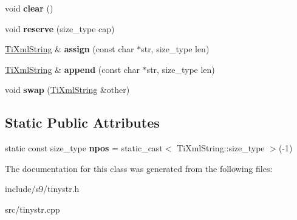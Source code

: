 \begin{DoxyCompactItemize}
\item 
\hypertarget{classTiXmlString_ab20e06e4c666abf3bdbfb3a1191d4888}{void {\bfseries clear} ()}\label{classTiXmlString_ab20e06e4c666abf3bdbfb3a1191d4888}

\item 
\hypertarget{classTiXmlString_a88ecf9f0f00cb5c67b6b637958d7049c}{void {\bfseries reserve} (size\-\_\-type cap)}\label{classTiXmlString_a88ecf9f0f00cb5c67b6b637958d7049c}

\item 
\hypertarget{classTiXmlString_ac72f3d9149b7812c1e6c59402014d0d5}{\hyperlink{classTiXmlString}{Ti\-Xml\-String} \& {\bfseries assign} (const char $\ast$str, size\-\_\-type len)}\label{classTiXmlString_ac72f3d9149b7812c1e6c59402014d0d5}

\item 
\hypertarget{classTiXmlString_ad44b21700d2ec24a511367b222b643fb}{\hyperlink{classTiXmlString}{Ti\-Xml\-String} \& {\bfseries append} (const char $\ast$str, size\-\_\-type len)}\label{classTiXmlString_ad44b21700d2ec24a511367b222b643fb}

\item 
\hypertarget{classTiXmlString_aa392cbc180752a79f007f4f9280c7762}{void {\bfseries swap} (\hyperlink{classTiXmlString}{Ti\-Xml\-String} \&other)}\label{classTiXmlString_aa392cbc180752a79f007f4f9280c7762}

\end{DoxyCompactItemize}
\subsection*{Static Public Attributes}
\begin{DoxyCompactItemize}
\item 
\hypertarget{classTiXmlString_a8f4422d227088dc7bec96f479b275d0a}{static const size\-\_\-type {\bfseries npos} = static\-\_\-cast$<$ Ti\-Xml\-String\-::size\-\_\-type $>$(-\/1)}\label{classTiXmlString_a8f4422d227088dc7bec96f479b275d0a}

\end{DoxyCompactItemize}


The documentation for this class was generated from the following files\-:\begin{DoxyCompactItemize}
\item 
include/s9/tinystr.\-h\item 
src/tinystr.\-cpp\end{DoxyCompactItemize}
